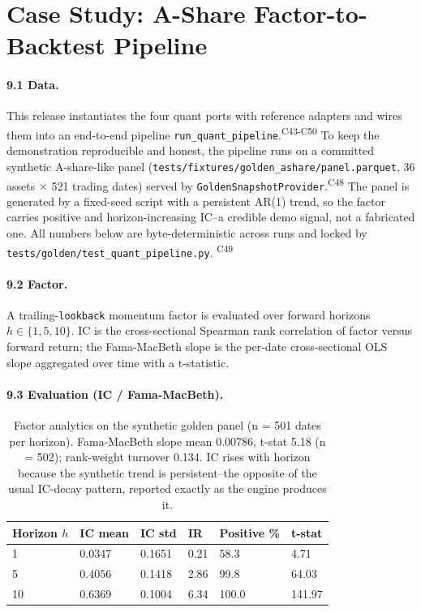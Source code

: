 \documentclass[11pt]{article}
\newcommand{\claim}[1]{\textsuperscript{\textsf{#1}}}
\begin{document}
\section{Case Study: A-Share Factor-to-Backtest Pipeline}
\label{sec:case-ashare}

\paragraph{9.1 Data.}
This release instantiates the four quant ports with reference adapters and wires them into an
end-to-end pipeline \verb|run_quant_pipeline|.\claim{C43-C50} To keep the demonstration
reproducible and honest, the pipeline runs on a committed synthetic A-share-like panel
(\texttt{tests/fixtures/golden\_ashare/panel.parquet}, 36 assets $\times$ 521 trading
dates) served by \texttt{GoldenSnapshotProvider}.\claim{C48} The panel is generated by a
fixed-seed script with a persistent AR(1) trend, so the factor carries positive and
horizon-increasing IC--a credible demo signal, not a fabricated one. All numbers below are
byte-deterministic across runs and locked by \texttt{tests/golden/test\_quant\_pipeline.py}.
\claim{C49}

\paragraph{9.2 Factor.}
A trailing-\texttt{lookback} momentum factor is evaluated over forward horizons
$h \in \{1,5,10\}$. IC is the cross-sectional Spearman rank correlation of factor versus
forward return; the Fama-MacBeth slope is the per-date cross-sectional OLS slope aggregated
over time with a t-statistic.

\paragraph{9.3 Evaluation (IC / Fama-MacBeth).}
\begin{table}[t]
\centering
\small
\begin{tabularx}{\linewidth}{lYYYYl}
\toprule
Horizon $h$ & IC mean & IC std & IR & Positive \% & t-stat \\
 & 0.0347 & 0.1651 & 0.21 & 58.3 & 4.71 \\
5 & 0.4056 & 0.1418 & 2.86 & 99.8 & 64.03 \\
10 & 0.6369 & 0.1004 & 6.34 & 100.0 & 141.97 \\
\bottomrule
\end{tabularx}
\caption{Factor analytics on the synthetic golden panel (n = 501 dates per horizon).
Fama-MacBeth slope mean 0.00786, t-stat 5.18 (n = 502); rank-weight turnover 0.134. IC
rises with horizon because the synthetic trend is persistent--the opposite of the usual
IC-decay pattern, reported exactly as the engine produces it.}
\label{tab:quant-analytics}
\end{table}
\end{document}
